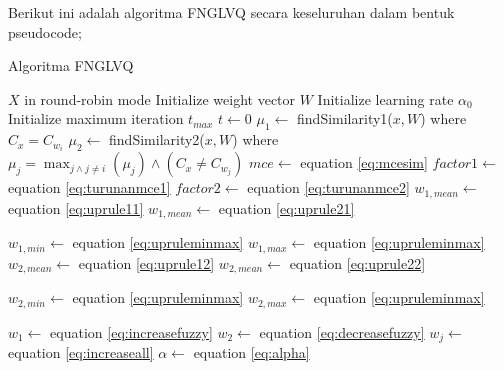 \clearpage

\noindent Berikut ini adalah algoritma FNGLVQ secara keseluruhan dalam bentuk
pseudocode;

\begin{algorithm}  
\scriptsize 
\caption{Algoritma FNGLVQ}          
\label{alg:fnglvq}                           
\begin{algorithmic}                    %
	\REQUIRE $X$ in round-robin mode
	\STATE Initialize weight vector $W$
	\STATE Initialize learning rate $\alpha_0$
	\STATE Initialize maximum iteration $t_{max}$
	\STATE $t \leftarrow 0$
			\STATE $\mu_1 \leftarrow $ findSimilarity1($x, W$) where $C_x = C_{w_i}$
			\STATE $\mu_2 \leftarrow $ findSimilarity2($x, W$) where $\mu_j = \max_{j
			\wedge j \neq i}(\mu_j) \wedge (C_x \neq C_{w_j})$
				\STATE $mce \leftarrow $ equation \ref{eq:mcesim}
				\STATE $factor1 \leftarrow $ equation \ref{eq:turunanmce1}
				\STATE $factor2 \leftarrow $ equation \ref{eq:turunanmce2}
				\STATE
				\STATE {}
					\STATE $w_{1,mean} \leftarrow $ equation \ref{eq:uprule11}
					\STATE $w_{1,mean} \leftarrow $ equation \ref{eq:uprule21}
				\ENDIF
	
				\STATE $w_{1,min} \leftarrow $ equation \ref{eq:upruleminmax}
				\STATE $w_{1,max} \leftarrow $ equation \ref{eq:upruleminmax}
				\STATE
				\STATE {}
					\STATE $w_{2,mean} \leftarrow $ equation \ref{eq:uprule12}
					\STATE $w_{2,mean} \leftarrow $ equation \ref{eq:uprule22}
				\ENDIF
	
				\STATE $w_{2,min} \leftarrow $ equation \ref{eq:upruleminmax}
				\STATE $w_{2,max} \leftarrow $ equation \ref{eq:upruleminmax}
	
				\STATE
					\STATE {}
					\STATE $w_1 \leftarrow$ equation \ref{eq:increasefuzzy}
				\ELSE
					\STATE {}
					\STATE $w_2 \leftarrow$  equation \ref{eq:decreasefuzzy}
				\ENDIF
			\ELSE
				\STATE {}
					\STATE $w_j \leftarrow $ equation \ref{eq:increaseall}
				\ENDFOR
			\ENDIF
		\ENDFOR
	\ENDWHILE
	\STATE $\alpha \leftarrow $ equation \ref{eq:alpha} 
\end{algorithmic}
\end{algorithm}  

